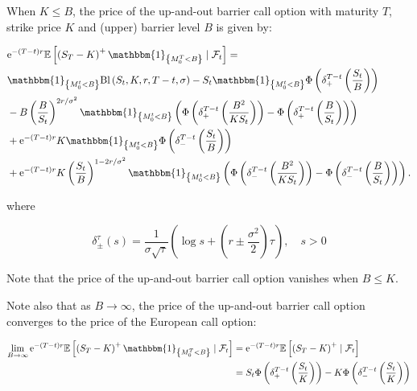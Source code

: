 \begin{proposition} When $K \leq B$, the price of the up-and-out barrier call option with maturity $T$, strike price $K$ and (upper) barrier level $B$ is given by:

\[
\begin{aligned}
& \mathrm{e}^{-(T-t) r} \mathbb{E}\left[\left(S_{T}-K\right)^{+} \mathbbm{1}_{\left\{M_{0}^{T}<B\right\}} \mid \mathcal{F}_{t}\right] = \\
& \mathbbm{1}_{\left\{M_{0}^{t}<B\right\}} \mathrm{Bl}\left(S_{t}, K, r, T-t, \sigma\right)-S_{t} \mathbbm{1}_{\left\{M_{0}^{t}<B\right\}} \Phi\left(\delta_{+}^{T-t}\left(\frac{S_{t}}{B}\right)\right) \\
& -B\left(\frac{B}{S_{t}}\right)^{2 r / \sigma^{2}} \mathbbm{1}_{\left\{M_{0}^{t}<B\right\}}\left(\Phi\left(\delta_{+}^{T-t}\left(\frac{B^{2}}{K S_{t}}\right)\right)-\Phi\left(\delta_{+}^{T-t}\left(\frac{B}{S_{t}}\right)\right)\right) \\
& +\mathrm{e}^{-(T-t) r} K \mathbbm{1}_{\left\{M_{0}^{t}<B\right\}} \Phi\left(\delta_{-}^{T-t}\left(\frac{S_{t}}{B}\right)\right) \\
& +\mathrm{e}^{-(T-t) r} K\left(\frac{S_{t}}{B}\right)^{1-2 r / \sigma^{2}} \mathbbm{1}_{\left\{M_{0}^{t}<B\right\}}\left(\Phi\left(\delta_{-}^{T-t}\left(\frac{B^{2}}{K S_{t}}\right)\right)-\Phi\left(\delta_{-}^{T-t}\left(\frac{B}{S_{t}}\right)\right)\right) .
\end{aligned}
\]

where

\[
\delta_{ \pm}^{\tau}(s)=\frac{1}{\sigma \sqrt{\tau}}\left(\log s+\left(r \pm \frac{\sigma^{2}}{2}\right) \tau\right), \quad s>0
\]

Note that the price of the up-and-out barrier call option vanishes when $B \leq K$.

Note also that as $B \to \infty$, the price of the up-and-out barrier call option converges to the price of the European call option:
 
\[
\begin{aligned}
\lim _{B \rightarrow \infty} \mathrm{e}^{-(T-t) r} \mathbb{E}\left[\left(S_{T}-K\right)^{+} \mathbbm{1}_{\left\{M_{0}^{T}<B\right\}} \mid \mathcal{F}_{t}\right] &= \mathrm{e}^{-(T-t) r} \mathbb{E}\left[\left(S_{T}-K\right)^{+} \mid \mathcal{F}_{t}\right] \\
&= S_{t} \Phi\left(\delta_{+}^{T-t}\left(\frac{S_{t}}{K}\right)\right)-K \Phi\left(\delta_{-}^{T-t}\left(\frac{S_{t}}{K}\right)\right)
\end{aligned}
\]

\end{proposition}



